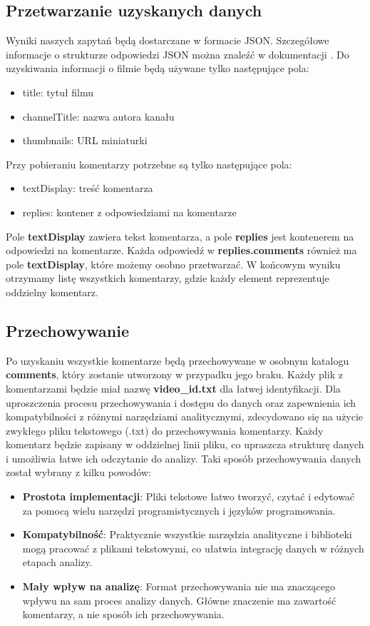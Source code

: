 	\subsection{Przetwarzanie uzyskanych danych}
		Wyniki naszych zapytań będą dostarczane w formacie JSON. Szczegółowe informacje o strukturze odpowiedzi JSON można znaleźć w dokumentacji \cite{YouTubeAPI}. Do uzyskiwania informacji o filmie będą używane tylko następujące pola:
		\begin{itemize}
			\item title: tytuł filmu
			\item channelTitle: nazwa autora kanału
			\item thumbnails: URL miniaturki
		\end{itemize}				
		 Przy pobieraniu komentarzy potrzebne są tylko następujące pola:
		 \begin{itemize}
		 	\item textDisplay: treść komentarza
		 	\item replies: kontener z odpowiedziami na komentarze
		 \end{itemize}
 		 Pole \textbf{textDisplay} zawiera tekst komentarza, a pole \textbf{replies} jest kontenerem na odpowiedzi na komentarze. Każda odpowiedź w \textbf{replies.comments} również ma pole \textbf{textDisplay}, które możemy osobno przetwarzać. W końcowym wyniku otrzymamy listę wszystkich komentarzy, gdzie każdy element reprezentuje oddzielny komentarz.
		
	\subsection{Przechowywanie}
		Po uzyskaniu wszystkie komentarze będą przechowywane w osobnym katalogu \textbf{comments}, który zostanie utworzony w przypadku jego braku. Każdy plik z komentarzami będzie miał nazwę \textbf{video\_id.txt} dla łatwej identyfikacji.
		Dla uproszczenia procesu przechowywania i dostępu do danych oraz zapewnienia ich kompatybilności z różnymi narzędziami analitycznymi, zdecydowano się na użycie zwykłego pliku tekstowego (.txt) do przechowywania komentarzy. Każdy komentarz będzie zapisany w oddzielnej linii pliku, co upraszcza strukturę danych i umożliwia łatwe ich odczytanie do analizy.
		Taki sposób przechowywania danych został wybrany z kilku powodów:
	\begin{itemize}
		\item \textbf{Prostota implementacji}: Pliki tekstowe łatwo tworzyć, czytać i edytować za pomocą wielu narzędzi programistycznych i języków programowania.
		\item \textbf{Kompatybilność}: Praktycznie wszystkie narzędzia analityczne i biblioteki mogą pracować z plikami tekstowymi, co ułatwia integrację danych w różnych etapach analizy.
		\item \textbf{Mały wpływ na analizę}: Format przechowywania nie ma znaczącego wpływu na sam proces analizy danych. Główne znaczenie ma zawartość komentarzy, a nie sposób ich przechowywania.
	\end{itemize}

